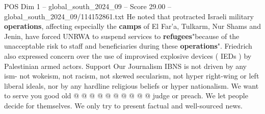 \begin{textsample}{POS Dim 1 – global\_south\_2024\_09 – Score 29.00 – global\_south\_2024\_09/114152861.txt}
He noted that protracted Israeli military \textbf{operations}, affecting especially the \textbf{camps} of El Far'a, Tulkarm, Nur Shams and Jenin, have forced UNRWA to suspend services to \textbf{refugees}"because of the unacceptable risk to staff and beneficiaries during these \textbf{operations}".
Friedrich also expressed concern over the use of improvised explosive devices ( IEDs ) by Palestinian armed actors.
Support Our Journalism IBNS is not driven by any ism- not wokeism, not racism, not skewed secularism, not hyper right-wing or left liberal ideals, nor by any hardline religious beliefs or hyper nationalism.
We want to serve you good old @ @ @ @ @ @ @ @ @ @ judge or preach.
We let people decide for themselves.
We only try to present factual and well-sourced news.

\end{textsample}

